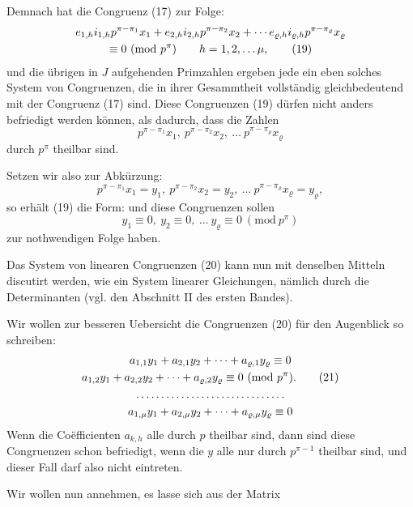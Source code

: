 Demnach hat die Congruenz (17) zur Folge:
\begin{gather}
e_{1,h}i_{1,h}p^{\pi-\pi_1}x_1 + e_{2,h}i_{2,h}p^{\pi-\pi_2}x_2 + \cdots e_{\varrho,h}i_{\varrho,h}p^{\pi-\pi_\varrho}x_\varrho \notag\\
\equiv 0\ (\mathrm{mod}\ p^\pi) \qquad h = 1, 2, \dots \mu, \tag{19}
\end{gather}
und die übrigen in $J$ aufgehenden Primzahlen ergeben jede ein
eben solches System von Congruenzen, die in ihrer Gesammtheit
vollständig gleichbedeutend mit der Congruenz (17) sind. Diese
Congruenzen (19) dürfen nicht anders befriedigt werden können,
als dadurch, dass die Zahlen
\[
p^{\pi-\pi_1}x_1,\ p^{\pi-\pi_2}x_2,\ \dots\ p^{\pi-\pi_\varrho}x_\varrho
\]
durch $p^\pi$ theilbar sind.

    Setzen wir also zur Abkürzung:
\[
p^{\pi-\pi_1}x_1 = y_1,\ p^{\pi-\pi_2}x_2 = y_2,\ \dots\ p^{\pi-\pi_\varrho}x_\varrho = y_\varrho,
\]
so erhält (19) die Form:
und diese Congruenzen sollen
\[
y_1 \equiv 0,\ y_2 \equiv 0,\ \dots\ y_\varrho \equiv 0\ (\mathrm{mod}\ p^\pi)
\]
zur nothwendigen Folge haben.

    Das System von linearen Congruenzen (20) kann nun mit
denselben Mitteln discutirt werden, wie ein System linearer Gleichungen, nämlich durch die Determinanten (vgl. den Abschnitt II
des ersten Bandes).

    Wir wollen zur besseren Uebersicht die Congruenzen (20)
für den Augenblick so schreiben:
\begin{gather}
a_{1,1}y_1 + a_{2,1}y_2 + \cdots + a_{\varrho,1}y_\varrho \equiv 0 \notag\\
a_{1,2}y_1 + a_{2,2}y_2 + \cdots + a_{\varrho,2}y_\varrho \equiv 0\ (\mathrm{mod}\ p^\pi). \tag{21}\\
\dots\dots\dots\dots\dots\dots\dots\dots\dots\dots \notag\\
a_{1,\mu}y_1 + a_{2,\mu}y_2 + \cdots + a_{\varrho,\mu}y_\varrho \equiv 0 \notag
\end{gather}
Wenn die Coëfficienten $a_{k,h}$ alle durch $p$ theilbar sind, dann
sind diese Congruenzen schon befriedigt, wenn die $y$ alle nur
durch $p^{\pi-1}$ theilbar sind, und dieser Fall darf also nicht eintreten.

    Wir wollen nun annehmen, es lasse sich aus der Matrix
